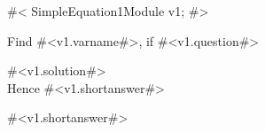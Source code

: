 

#<
SimpleEquation1Module v1;
#>

Find #<v1.varname#>, if  #<v1.question#>

#<v1.solution#> \\[1.6mm]
Hence #<v1.shortanswer#> 

#<v1.shortanswer#>


